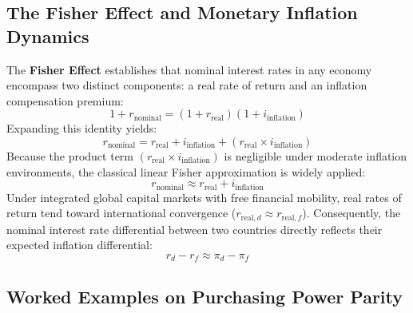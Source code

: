 \subsection{The Fisher Effect and Monetary Inflation Dynamics}
The \textbf{Fisher Effect} establishes that nominal interest rates in any economy encompass two distinct components: a real rate of return and an inflation compensation premium:
\begin{equation}
    1 + r_{\text{nominal}} = (1 + r_{\text{real}})(1 + i_{\text{inflation}})
\end{equation}
Expanding this identity yields:
\begin{equation*}
    r_{\text{nominal}} = r_{\text{real}} + i_{\text{inflation}} + (r_{\text{real}} \times i_{\text{inflation}})
\end{equation*}
Because the product term $(r_{\text{real}} \times i_{\text{inflation}})$ is negligible under moderate inflation environments, the classical linear Fisher approximation is widely applied:
\begin{equation}
    r_{\text{nominal}} \approx r_{\text{real}} + i_{\text{inflation}}
\end{equation}
Under integrated global capital markets with free financial mobility, real rates of return tend toward international convergence ($r_{\text{real}, d} \approx r_{\text{real}, f}$). Consequently, the nominal interest rate differential between two countries directly reflects their expected inflation differential:
\begin{equation}
    r_d - r_f \approx \pi_d - \pi_f
\end{equation}

\clearpage
\subsection{Worked Examples on Purchasing Power Parity}

